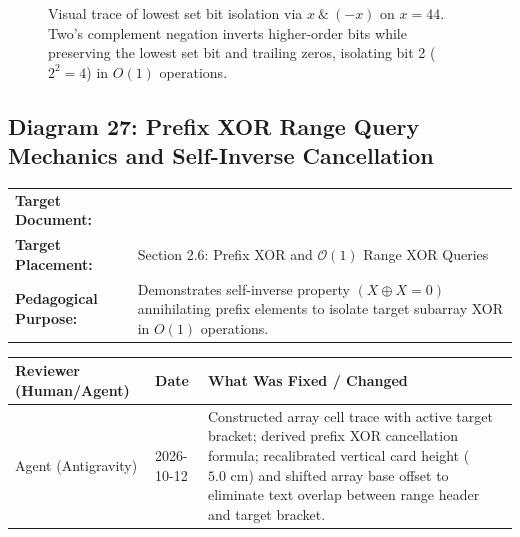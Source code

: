 \documentclass[11pt,a4paper]{article}
\newcommand{\breadcrumb}[3]{
    \par\vspace{0.15cm}
    \noindent\begin{tabularx}{\textwidth}{|l|X|}
    \hline
    \textbf{Target Document:} & \texttt{\detokenize{#1}} \\
    \textbf{Target Placement:} & #2 \\
    \textbf{Pedagogical Purpose:} & #3 \\
    \hline
    \end{tabularx}
    \vspace{0.15cm}\par
}
\newcommand{\diagramaudit}[3]{
    \par\vspace{0.12cm}
    \noindent\begin{tabularx}{\textwidth}{|l|l|>{\raggedright\arraybackslash}X|}
    \hline
    \textbf{Reviewer (Human/Agent)} & \textbf{Date} & \textbf{What Was Fixed / Changed} \\ \hline
    #1 & #2 & #3 \\ \hline
    \end{tabularx}
    \vspace{0.12cm}\par
}
\begin{document}
\begin{figure}[htbp]
{}
\caption{Visual trace of lowest set bit isolation via $x \ \& \ (-x)$ on $x = 44$. Two's complement negation inverts higher-order bits while preserving the lowest set bit and trailing zeros, isolating bit 2 ($2^2 = 4$) in $O(1)$ operations.}
\end{figure}

\subsection{Diagram 27: Prefix XOR Range Query Mechanics and Self-Inverse Cancellation}

\breadcrumb{12.bit_manipulation_and_bitmasks.tex}{Section 2.6: Prefix XOR and $\mathcal{O}(1)$ Range XOR Queries}{Demonstrates self-inverse property $(X \oplus X = 0)$ annihilating prefix elements to isolate target subarray XOR in $O(1)$ operations.}

\diagramaudit{Agent (Antigravity)}{2026-10-12}{Constructed array cell trace with active target bracket; derived prefix XOR cancellation formula; recalibrated vertical card height ($5.0\text{ cm}$) and shifted array base offset to eliminate text overlap between range header and target bracket.}
\end{document}
